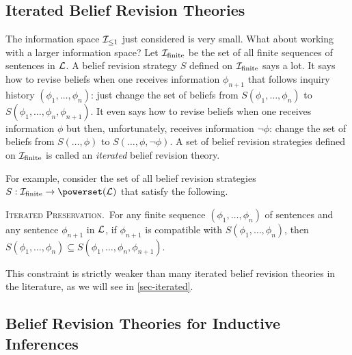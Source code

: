 \subsection{Iterated Belief Revision Theories}

The information space ${\cal I}_{\leq 1}$ just considered is very small. What about working with a larger information space? Let ${\cal I}_{\textrm{finite}}$ be the set of all finite sequences of sentences in ${\cal L}$. A belief revision strategy $S$ defined on ${\cal I}_{\textrm{finite}}$ says a lot. It says how to revise beliefs when one receives information $\phi_{n+1}$ that follows inquiry history $(\phi_1, \ldots, \phi_{n})$: just change the set of beliefs from $S(\phi_1, \ldots, \phi_{n})$ to $S(\phi_1, \ldots, \phi_{n}, \phi_{n+1})$. It even says how to revise beliefs when one receives information $\phi$ but then, unfortunately, receives information $\neg\phi$: change the set of beliefs from $S(\ldots, \phi)$ to $S(\ldots, \phi, \neg\phi)$. A set of belief revision strategies defined on ${\cal I}_{\textrm{finite}}$ is called an {\em iterated} belief revision theory. 

For example, consider the set of all belief revision strategies $S: {\cal I}_{\textrm{finite}} \to \powerset({\cal L)}$ that satisfy the following. \op

	\xm \textsc{Iterated Preservation.}\, For any finite sequence $(\phi_1, \ldots, \phi_{n})$ of sentences and any sentence $\phi_{n+1}$ in ${\cal L}$, if $\phi_{n+1}$ is compatible with $S(\phi_1, \ldots, \phi_{n})$, then $S(\phi_1, \ldots, \phi_{n}) \subseteq S(\phi_1, \ldots, \phi_{n}, \phi_{n+1})$.

\ed This constraint is strictly weaker than many iterated belief revision theories in the literature, as we will see in \autoref{sec-iterated}.




\subsection{Belief Revision Theories for Inductive Inferences}\label{sec-raven}
 
